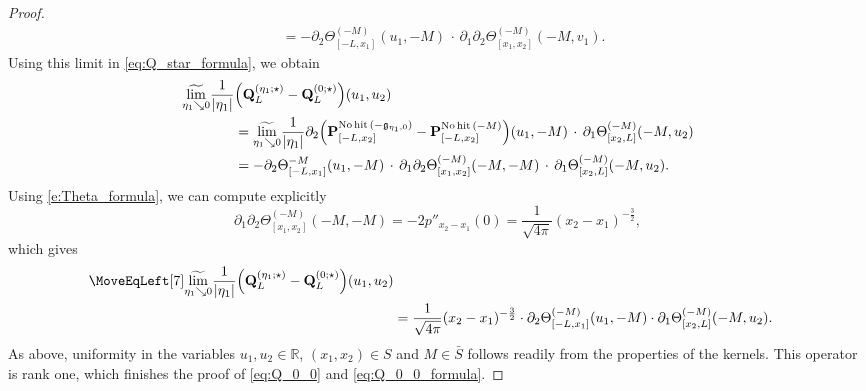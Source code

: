 \documentclass[oneside,final,11pt]{amsart}
\theoremstyle{definition}
\newcommand\nohit{\uptext{No\! hit}}
\newcommand{\fg}{\mathfrak{g}}
\newcommand{\mylim}[1]{\underset{#1}{\wt{\mathrm{lim}}}}
\newcommand{\R}{\mathbb{R}}
\newcommand{\1}[1]{\mathbf{1}_{#1}}
\newcommand{\wt}{\widetilde}
\newcommand{\uptext}[1]{\text{\upshape{#1}}}
\newcommand{\fx}{x}
\newcommand{\fM}{M}
\newcommand{\fP}{\mathbf{P}}
\newcommand{\fQ}{\mathbf{Q}}
\numberwithin{equation}{section}
\begin{document}
\begin{proof}
\begin{align}
&= -\partial_{2} \Theta^{(-\fM)}_{[-L, \fx_1]} (u_1, -\fM) \,\cdot\, \partial_{1} \partial_{2} \Theta^{(-\fM)}_{[\fx_1, \fx_2]} (-\fM, v_1).
\end{align}
Using this limit in \eqref{eq:Q_star_formula}, we obtain
\begin{align}
\mylim{\eta_1 \searrow 0} \frac{1}{|\eta_1|} &\Bigl(\fQ_L^{(\eta_1; \star)} - \fQ_L^{(0; \star)}\Bigr) (u_1, u_2) \\
&= \mylim{\eta_1 \searrow 0} \frac{1}{|\eta_1|} \partial_{2} \Bigl(\fP_{[-L,\fx_2]}^{\nohit\,(-\fg_{\eta_1, 0})} - \fP_{[-L,\fx_2]}^{\nohit\,(-\fM)} \Bigr) (u_1, -\fM) \,\cdot\, \partial_{1} \Theta^{(-\fM)}_{[\fx_2, L]} (-\fM, u_2)\\
&= -\partial_{2} \Theta^{-\fM}_{[-L, \fx_1]} (u_1, -\fM) \,\cdot\, \partial_{1} \partial_{2} \Theta^{(-\fM)}_{[\fx_1, \fx_2]} (-\fM, -\fM) \,\cdot\, \partial_{1} \Theta^{(-\fM)}_{[\fx_2, L]} (-\fM, u_2).
\end{align}
Using \eqref{e:Theta_formula}, we can compute explicitly
\begin{equation}
\partial_{1} \partial_{2} \Theta^{(-\fM)}_{[\fx_1, \fx_2]} (-\fM, -\fM) = -2 p''_{\fx_2 - \fx_1} (0) = \frac{1}{\sqrt{4\pi}} (\fx_2 - \fx_1)^{-\frac{3}{2}},
\end{equation}
which gives
\begin{align}
\MoveEqLeft[7]
\mylim{\eta_1 \searrow 0} \frac{1}{|\eta_1|} \Bigl(\fQ_L^{(\eta_1; \star)} - \fQ_L^{(0; \star)}\Bigr) (u_1, u_2)\\
&= \frac{1}{\sqrt{4\pi}} (\fx_2 - \fx_1)^{-\frac{3}{2}} \cdot \partial_{2} \Theta^{(-\fM)}_{[-L, \fx_1]} (u_1, -\fM) \cdot \partial_{1} \Theta^{(-\fM)}_{[\fx_2, L]} (-\fM, u_2).
\end{align}
As above, uniformity in the variables $u_1, u_2 \in \R$, $(x_1, x_2) \in S$ and $M \in \bar S$ follows readily from the properties of the kernels. This operator is rank one, which finishes the proof of \eqref{eq:Q_0_0} and \eqref{eq:Q_0_0_formula}.
\end{proof}
\end{document}
